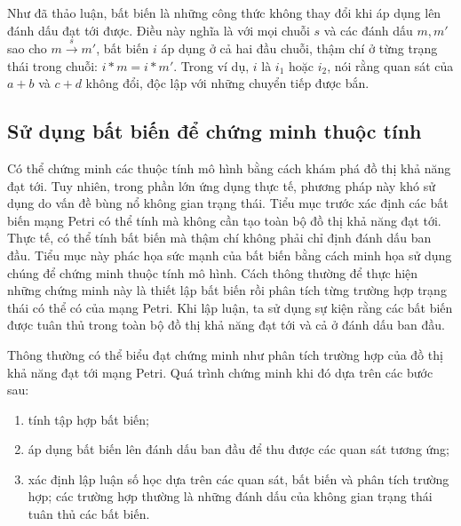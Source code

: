 Như đã thảo luận, bất biến là những công thức không thay đổi khi áp dụng lên đánh dấu đạt tới được. Điều này nghĩa là với mọi chuỗi $s$ và các đánh dấu $m,m'$ sao cho $m\xrightarrow{s}m'$, bất biến $i$ áp dụng ở cả hai đầu chuỗi, thậm chí ở từng trạng thái trong chuỗi: $i*m=i*m'$. Trong ví dụ, $i$ là $i_1$ hoặc $i_2$, nói rằng quan sát của $a+b$ và $c+d$ không đổi, độc lập với những chuyển tiếp được bắn.

\subsection{Sử dụng bất biến để chứng minh thuộc tính}
Có thể chứng minh các thuộc tính mô hình bằng cách khám phá đồ thị khả năng đạt tới. Tuy nhiên, trong phần lớn ứng dụng thực tế, phương pháp này khó sử dụng do vấn đề bùng nổ không gian trạng thái. Tiểu mục trước xác định các bất biến mạng Petri có thể tính mà không cần tạo toàn bộ đồ thị khả năng đạt tới. Thực tế, có thể tính bất biến mà thậm chí không phải chỉ định đánh dấu ban đầu. Tiểu mục này phác họa sức mạnh của bất biến bằng cách minh họa sử dụng chúng để chứng minh thuộc tính mô hình. Cách thông thường để thực hiện những chứng minh này là thiết lập bất biến rồi phân tích từng trường hợp trạng thái có thể có của mạng Petri. Khi lập luận, ta sử dụng sự kiện rằng các bất biến được tuân thủ trong toàn bộ đồ thị khả năng đạt tới và cả ở đánh dấu ban đầu.

Thông thường có thể biểu đạt chứng minh như phân tích trường hợp của đồ thị khả năng đạt tới mạng Petri. Quá trình chứng minh khi đó dựa trên các bước sau:
\begin{enumerate}
\item tính tập hợp bất biến;
\item áp dụng bất biến lên đánh dấu ban đầu để thu được các quan sát tương ứng;
\item xác định lập luận số học dựa trên các quan sát, bất biến và phân tích trường hợp; các trường hợp thường là những đánh dấu của không gian trạng thái tuân thủ các bất biến.
\end{enumerate}

